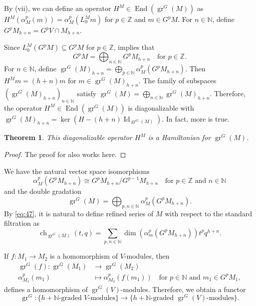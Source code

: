 \documentclass[a4paper, 12pt, reqno]{amsart}
\newtheorem{theorem}{Theorem}[subsection]
\theoremstyle{remark}
\numberwithin{equation}{subsection}
\DeclareMathOperator{\Id}{Id}
\DeclareMathOperator{\gr}{gr}
\DeclareMathOperator{\End}{End}
\DeclareMathOperator{\ch}{ch}
\begin{document}
By (vii), we can define an operator $H^M \in \End(\gr^G(M))$ as $H^M(\alpha_M^p(m)) = \alpha_M^p(L^M_0m)$ for $p \in \mathbb{Z}$ and $m \in G^pM$.
For $n \in \mathbb{N}$, define $G^pM_{h + n} = G^pV \cap M_{h + n}$.

Since $L_0^M(G^pM) \subseteq G^pM$ for $p \in \mathbb{Z}$,  implies that
\begin{equation}
  \label{eq:46}
  G^pM = \bigoplus_{n \in \mathbb{N}}G^pM_{h + n} \quad \text{for }p \in \mathbb{Z}.
\end{equation}
For $n \in \mathbb{N}$, define $\gr^G(M)_{h + n} = \bigoplus_{p \in \mathbb{N}}\alpha_M^p(G^pM_{h + n})$.
Then $H^Mm = (h + n)m$ for $m \in \gr^G(M)_{h + n}$.
The family of subspaces $(\gr^G(M)_{h + n})_{n \in \mathbb{N}}$ satisfy $\gr^G(M) = \bigoplus_{n \in \mathbb{N}} \gr^G(M)_{h + n}$.
Therefore, the operator $H^M \in \End(\gr^G(M))$ is diagonalizable with $\gr^G(M)_{h + n} = \ker(H - (h + n)\Id_{\gr^G(M)})$.
In fact, more is true.

\begin{theorem}
  \label{thr:36}
  This diagonalizable operator $H^M$ is a Hamiltonian for $\gr^G(M)$.
\end{theorem}

\begin{proof}
  The proof for  also works here.
\end{proof}

We have the natural vector space isomorphisms
\begin{equation*}
  \alpha_M^p(G^pM_{h + n}) \cong G^pM_{h + n}/G^{p - 1}M_{h + n} \quad \text{for }p \in \mathbb{Z}\text{ and }n \in \mathbb{N}
\end{equation*}
and the double gradation
\begin{equation}
  \label{eq:47}
  \gr^G(M) =\bigoplus_{p, n \in \mathbb{N}}\alpha_M^p(G^pM_{h + n}).
\end{equation}
By \eqref{eq:47}, it is natural to define refined series of $M$ with respect to the standard filtration as
\begin{equation*}
  \ch_{\gr^G(M)}(t, q) = \sum_{p, n \in \mathbb{N}}\dim(\alpha_m^p(G^pM_{h + n}))t^pq^{h + n}.
\end{equation*}

If $f: M_1 \to M_2$ is a homomorphism of $V$-modules, then
\begin{align*}
  \gr^G(f): \gr^G(M_1) &\to \gr^G(M_2) \\
  \alpha^p_{M_1}(m_1) &\mapsto \alpha^p_{M_2}(f(m_1)) \quad \text{for }p \in \mathbb{N}\text{ and } m_1 \in G^pM_1,
\end{align*}
defines a homomorphism of $\gr^G(V)$-modules.
Therefore, we obtain a functor
\begin{equation*}
  \gr^G: \{\text{$h + \mathbb{N}$-graded $V$-modules}\} \to \{\text{$h + \mathbb{N}$-graded $\gr^G(V)$-modules}\}.
\end{equation*}
\end{document}
